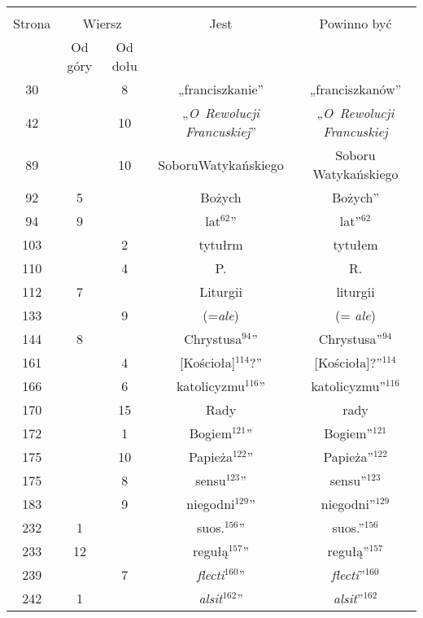 \documentclass[a4paper,11pt]{article}
\begin{document}
\vspace{\spaceFour}





\begin{center}
  \begin{tabular}{|c|c|c|c|c|}
    \hline
    & \multicolumn{2}{c|}{} & & \\
    Strona & \multicolumn{2}{c|}{Wiersz} & Jest
                              & Powinno być \\ \cline{2-3}
    & Od góry & Od dołu & & \\
    \hline
    30  & &  8 & „franciszkanie” & „franciszkanów” \\
    42  & & 10 & „\emph{O~Rewolucji Francuskiej}”
           & „\emph{O~Rewolucji Francuskiej} \\
    89  & & 10 & SoboruWatykańskiego & Soboru Watykańskiego \\
    92  &  5 & & Bożych & Bożych” \\
    94  &  9 & & lat$^{ 62 }$” & lat”$^{ 62 }$ \\
    103 & &  2 & tytułrm & tytułem \\
    110 & &  4 & P. & R. \\
    112 &  7 & & Liturgii & liturgii \\
    133 & &  9 & (=\emph{ale}) & (= \emph{ale}) \\
    144 &  8 & & Chrystusa$^{ 94 }$” & Chrystusa”$^{ 94 }$\\
    161 & &  4 & [Kościoła]$^{ 114 }$?” & [Kościoła]?”$^{ 114 }$ \\
    166 & &  6 & katolicyzmu$^{ 116 }$” & katolicyzmu”$^{ 116 }$ \\
    170 & & 15 & Rady & rady \\
    172 & &  1 & Bogiem$^{ 121 }$” & Bogiem”$^{ 121 }$ \\
    175 & & 10 & Papieża$^{ 122 }$” & Papieża”$^{ 122 }$ \\
    175 & &  8 & sensu$^{ 123 }$” & sensu”$^{ 123 }$ \\
    183 & &  9 & niegodni$^{ 129 }$” & niegodni”$^{ 129 }$ \\
    232 &  1 & & suos.$^{ 156 }$” & suos.”$^{ 156 }$ \\
    233 & 12 & & regułą$^{ 157 }$” & regułą”$^{ 157 }$ \\
    239 & &  7 & \emph{flecti}$^{ 160 }$” & \emph{flecti}”$^{ 160 }$ \\
    242 &  1 & & \emph{alsit}$^{ 162 }$” & \emph{alsit}”$^{ 162 }$ \\

\end{tabular}
\end{center}
\end{document}
